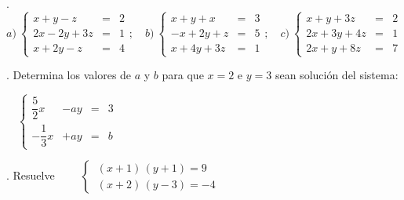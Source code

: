 \begin{mipropuesto}
. $a)\ \left\{\begin{array}{rrr} x+y-z&=&2\\ 2x-2y+3z&=&1 \\ x+2y-z&=&4 \end{array}	\right. ; \quad
b)\ \left\{ \begin{array}{rrr} x+y+x&=&3 \\ -x+2y+z&=&5 \\ x+4y+3z&=&1 \end{array} \right.; \quad
c)\ \left\{  \begin{array}{rrr} x+y+3z&=&2 \\ 2x+3y+4z&=&1 \\ 2x+y+8z&=&7 \end{array} \right.$
\end{mipropuesto}
\vspace{-8mm}
\begin{flushright}
	\begin{footnotesize} \textcolor{gris}{}	\end{footnotesize}
\end{flushright}

\begin{mipropuesto}
.  Determina los valores de $a$ y $b$ para que $x=2$ e $y=3$ sean solución del sistema: 

$\quad \left\{ \begin{array}{rrrr}  \dfrac 5 2 x&-ay &=&3 \\   -\dfrac 1 3 x &+ ay&=&b	 \end{array} \right.$
\end{mipropuesto}
\vspace{-8mm}
\begin{flushright}
	\begin{footnotesize} \textcolor{gris}{}	\end{footnotesize}
\end{flushright}


\begin{mipropuesto}
. Resuelve $\qquad \begin{cases} \ (x+1)\, (y+1) = 9 \\ \ (x+2)\, (y-3)=-4 \end{cases}$
\end{mipropuesto}
\vspace{-8mm}
\begin{flushright}
	\begin{footnotesize} \textcolor{gris}{}	\end{footnotesize}
\end{flushright}
\vspace{-8mm}
\begin{flushright}
	\begin{scriptsize} \textcolor{gris}{}	\end{scriptsize}
\end{flushright}


